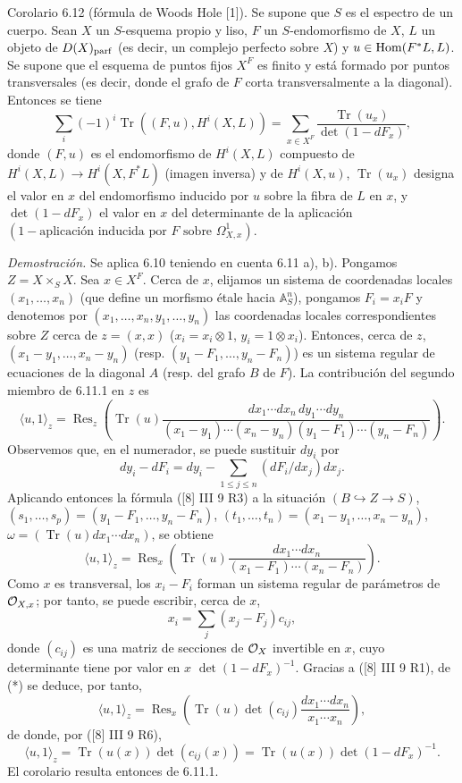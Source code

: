 \begin{statement}{Corolario 6.12}
(fórmula de Woods Hole [1]). Se supone que $S$ es el espectro de un cuerpo. Sean $X$ un $S$-esquema propio y liso, $F$ un $S$-endomorfismo de $X$, $L$ un objeto de $D(X)_{\mathrm{parf}}$ (es decir, un complejo perfecto sobre $X$) y $u\in\operatorname{Hom}(F^*L,L)$. Se supone que el esquema de puntos fijos $X^F$ es finito y está formado por puntos transversales (es decir, donde el grafo de $F$ corta transversalmente a la diagonal). Entonces se tiene
\[
\sum_i(-1)^i\operatorname{Tr}((F,u),H^i(X,L))=
\sum_{x\in X^F}\frac{\operatorname{Tr}(u_x)}{\det(1-dF_x)},
\]
donde $(F,u)$ es el endomorfismo de $H^i(X,L)$ compuesto de $H^i(X,L)\to H^i(X,F^*L)$ (imagen inversa) y de $H^i(X,u)$, $\operatorname{Tr}(u_x)$ designa el valor en $x$ del endomorfismo inducido por $u$ sobre la fibra de $L$ en $x$, y $\det(1-dF_x)$ el valor en $x$ del determinante de la aplicación $(1-\text{aplicación inducida por }F\text{ sobre }\Omega^1_{X,x})$.

\emph{Demostración.} Se aplica 6.10 teniendo en cuenta 6.11 a), b). Pongamos $Z=X\times_S X$. Sea $x\in X^F$. Cerca de $x$, elijamos un sistema de coordenadas locales $(x_1,\ldots,x_n)$ (que define un morfismo étale hacia $\mathbb A_S^n$), pongamos $F_i=x_iF$ y denotemos por $(x_1,\ldots,x_n,y_1,\ldots,y_n)$ las coordenadas locales correspondientes sobre $Z$ cerca de $z=(x,x)$ ($x_i=x_i\otimes1$, $y_i=1\otimes x_i$). Entonces, cerca de $z$, $(x_1-y_1,\ldots,x_n-y_n)$ (resp. $(y_1-F_1,\ldots,y_n-F_n)$) es un sistema regular de ecuaciones de la diagonal $A$ (resp. del grafo $B$ de $F$). La contribución del segundo miembro de 6.11.1 en $z$ es
\[
\langle u,1\rangle_z=
\operatorname{Res}_z\left(\operatorname{Tr}(u)\frac{dx_1\cdots dx_n\,dy_1\cdots dy_n}{(x_1-y_1)\cdots(x_n-y_n)(y_1-F_1)\cdots(y_n-F_n)}\right).
\]
Observemos que, en el numerador, se puede sustituir $dy_i$ por
\[
dy_i-dF_i=dy_i-\sum_{1\le j\le n}(dF_i/dx_j)dx_j.
\]
Aplicando entonces la fórmula ([8] III 9 R3) a la situación $(B\hookrightarrow Z\to S)$, $(s_1,\ldots,s_p)=(y_1-F_1,\ldots,y_n-F_n)$, $(t_1,\ldots,t_n)=(x_1-y_1,\ldots,x_n-y_n)$, $\omega=(\operatorname{Tr}(u)dx_1\cdots dx_n)$, se obtiene
\begin{equation}
\tag{*}
\langle u,1\rangle_z=
\operatorname{Res}_x\left(\operatorname{Tr}(u)\frac{dx_1\cdots dx_n}{(x_1-F_1)\cdots(x_n-F_n)}\right).
\end{equation}
Como $x$ es transversal, los $x_i-F_i$ forman un sistema regular de parámetros de $\mathcal{O}_{X,x}$; por tanto, se puede escribir, cerca de $x$,
\[
x_i=\sum_j(x_j-F_j)c_{ij},
\]
donde $(c_{ij})$ es una matriz de secciones de $\mathcal{O}_X$ invertible en $x$, cuyo determinante tiene por valor en $x$ $\det(1-dF_x)^{-1}$. Gracias a ([8] III 9 R1), de (*) se deduce, por tanto,
\[
\langle u,1\rangle_z=\operatorname{Res}_x\left(\operatorname{Tr}(u)\det(c_{ij})\frac{dx_1\cdots dx_n}{x_1\cdots x_n}\right),
\]
de donde, por ([8] III 9 R6),
\[
\langle u,1\rangle_z=\operatorname{Tr}(u(x))\det(c_{ij}(x))=\operatorname{Tr}(u(x))\det(1-dF_x)^{-1}.
\]
El corolario resulta entonces de 6.11.1.
\end{statement}

